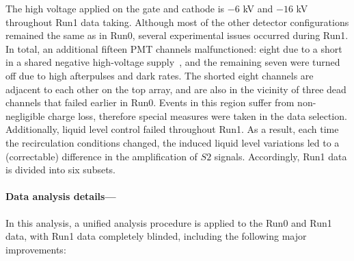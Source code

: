 \documentclass[%
 reprint,
superscriptaddress,
 amsmath,amssymb,
 aps,
 prl,
]{revtex4-1}
\begin{document}
The high voltage applied on the gate and cathode is $-6$ kV and $-16$ kV throughout Run1 data taking.
Although most of the other detector configurations remained the same as in Run0, several experimental issues occurred during Run1. In total, an additional fifteen PMT channels malfunctioned: eight due to a short in a shared negative high-voltage supply~\cite{Elsied:2015ixa}, and the remaining seven were turned off due to high afterpulses and dark rates. 
The shorted eight channels are adjacent to each other on the top array, and are also in the vicinity of three dead channels that failed earlier in Run0. Events in this region suffer from non-negligible charge loss, therefore special measures were taken in the data selection. 
Additionally, liquid level control failed throughout Run1. As a result, each time the recirculation conditions changed, the induced liquid level variations led to a (correctable) difference in the amplification of $S2$ signals.
Accordingly, Run1 data is divided into six subsets.


\paragraph{Data analysis details—}
In this analysis, a unified analysis procedure is applied to the Run0 and Run1 data, with Run1 data completely blinded, including the following major improvements:
\end{document}
